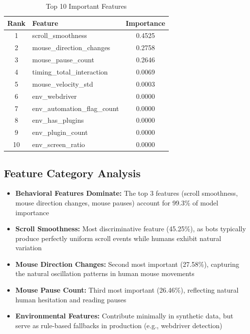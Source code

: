 \begin{table}[H]
\centering
\caption{Top 10 Important Features}
\label{tab:feature_importance}
\begin{tabular}{|c|l|c|}
\hline
\textbf{Rank} & \textbf{Feature} & \textbf{Importance} \\
\hline
1 & scroll\_smoothness & 0.4525 \\
\hline
2 & mouse\_direction\_changes & 0.2758 \\
\hline
3 & mouse\_pause\_count & 0.2646 \\
\hline
4 & timing\_total\_interaction & 0.0069 \\
\hline
5 & mouse\_velocity\_std & 0.0003 \\
\hline
6 & env\_webdriver & 0.0000 \\
\hline
7 & env\_automation\_flag\_count & 0.0000 \\
\hline
8 & env\_has\_plugins & 0.0000 \\
\hline
9 & env\_plugin\_count & 0.0000 \\
\hline
10 & env\_screen\_ratio & 0.0000 \\
\hline
\end{tabular}
\end{table}

\subsection{Feature Category Analysis}

\begin{itemize}
    \item \textbf{Behavioral Features Dominate:} The top 3 features (scroll smoothness, mouse direction changes, mouse pauses) account for 99.3\% of model importance
    
    \item \textbf{Scroll Smoothness:} Most discriminative feature (45.25\%), as bots typically produce perfectly uniform scroll events while humans exhibit natural variation
    
    \item \textbf{Mouse Direction Changes:} Second most important (27.58\%), capturing the natural oscillation patterns in human mouse movements
    
    \item \textbf{Mouse Pause Count:} Third most important (26.46\%), reflecting natural human hesitation and reading pauses
    
    \item \textbf{Environmental Features:} Contribute minimally in synthetic data, but serve as rule-based fallbacks in production (e.g., webdriver detection)
\end{itemize}

